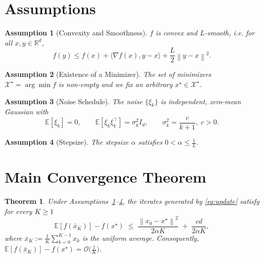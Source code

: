 \documentclass{article}
\newtheorem{theorem}{Theorem}
\newtheorem{assumption}{Assumption}
\newcommand{\E}{\mathbb{E}}
\newcommand{\norm}[1]{\left\lVert #1\right\rVert}
\newcommand{\ip}[2]{\langle #1,#2\rangle}
\begin{document}
\newpage

\section*{Assumptions}
\begin{assumption}[Convexity and Smoothness]\label{ass:convex}
$f$ is convex and $L$‑smooth, i.e. for all $x,y\in\mathbb{R}^d$,
\[
f(y)\le f(x)+\ip{\nabla f(x)}{y-x}+\frac{L}{2}\norm{y-x}^2.
\]
\end{assumption}
\begin{assumption}[Existence of a Minimizer]\label{ass:min}
The set of minimizers $\mathcal{X}^\star=\arg\min f$ is non‑empty and we fix an arbitrary $x^\star\in\mathcal{X}^\star$.
\end{assumption}
\begin{assumption}[Noise Schedule]\label{ass:noise}
The noise $\{\xi_k\}$ is independent, zero‑mean Gaussian with
\[
\E[\xi_k]=0,\qquad \E[\xi_k\xi_k^\top]=\sigma_k^2 I_d,\qquad 
\sigma_k^2=\frac{c}{k+1},\;c>0.
\]
\end{assumption}
\begin{assumption}[Stepsize]\label{ass:stepsize}
The stepsize $\alpha$ satisfies $0<\alpha\le \frac{1}{L}$.
\end{assumption}

\section*{Main Convergence Theorem}
\begin{theorem}\label{thm:rate}
Under Assumptions~\ref{ass:convex}--\ref{ass:stepsize}, the iterates generated by \eqref{eq:update} satisfy for every $K\ge 1$
\[
\E\!\left[f\!\left(\bar{x}_K\right)\right]-f(x^\star)
   \;\le\;
   \frac{\norm{x_0-x^\star}^2}{2\alpha K}
   \;+\;
   \frac{c d}{2\alpha K},
\]
where $\displaystyle \bar{x}_K:=\frac{1}{K}\sum_{k=0}^{K-1}x_k$ is the uniform average.
Consequently, $\E[f(\bar{x}_K)]-f(x^\star)=\mathcal{O}\!\bigl(\tfrac{1}{K}\bigr)$.
\end{theorem}
\end{document}
